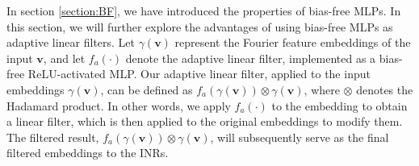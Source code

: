 In section \ref{section:BF}, we have introduced the properties of bias-free MLPs. In this section, we will further explore the advantages of using bias-free MLPs as adaptive linear filters. Let $\gamma(\mathbf{v})$ represent the Fourier feature embeddings of the input $\mathbf{v}$, and let \( f_{a}(\cdot) \) denote the adaptive linear filter, implemented as a bias-free ReLU-activated MLP. Our adaptive linear filter, applied to the input embeddings $\gamma(\mathbf{v})$, can be defined as $f_{a}(\gamma(\mathbf{v}))\otimes\gamma(\mathbf{v})$, where $\otimes$ denotes the Hadamard product. In other words, we apply \( f_{a}(\cdot) \) to the embedding to obtain a linear filter, which is then applied to the original embeddings to modify them. The filtered result, \( f_{a}(\gamma(\mathbf{v})) \otimes \gamma(\mathbf{v}) \), will subsequently serve as the final filtered embeddings to the INRs.

